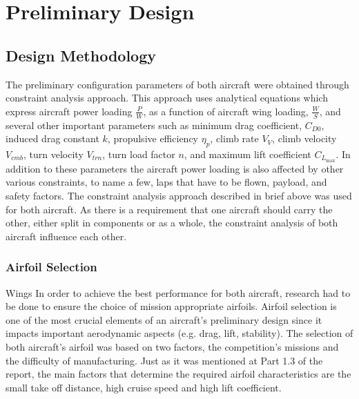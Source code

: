 \section{Preliminary Design}

\subsection{Design Methodology}

The preliminary configuration parameters of both aircraft were obtained through constraint analysis approach. This approach uses analytical equations which express aircraft power loading $\frac{P}{W}$, as a function of aircraft wing loading, $\frac{W}{S}$, and several other important parameters such as minimum drag coefficient, $C_{D0}$, induced drag constant $k$, propulsive efficiency $\eta_p$, climb rate $V_V$, climb velocity $V_{cmb}$, turn velocity $V_{trn}$, turn load factor $n$, and maximum lift coefficient  $C_{L_\text{max}}$. In addition to these parameters the aircraft power loading  is also affected by other various constraints, to name a few, laps that have to be flown, payload, and safety factors. The constraint analysis approach described in brief above was used for both aircraft. As there is a requirement that one aircraft should carry the other, either split in components or as a whole, the constraint analysis of both aircraft influence each other. 

%
%
%
%
%
%
%


\subsubsection{Airfoil Selection}
Wings
In order to achieve the best performance for both aircraft, research had to be done to ensure the choice of  mission appropriate airfoils. Airfoil selection is one of the most crucial elements of an aircraft’s preliminary design since it impacts important aerodynamic aspects (e.g. drag, lift, stability). 
The selection of both aircraft’s airfoil was based on two factors, the competition’s missions and the difficulty of manufacturing. Just as it was mentioned at Part 1.3 of the report, the main factors that determine the required airfoil characteristics are the small take off distance, high cruise speed and high lift coefficient.

